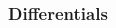\subsubsection{Differentials}
\begin{multicols}{2}
\begin{itemize}
 \item[$ $]
\end{itemize}
\end{multicols}

